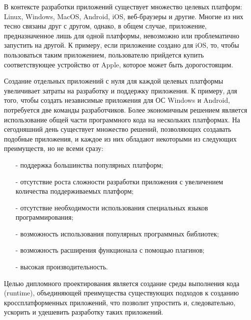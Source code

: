 В контексте разработки приложений существует множество целевых платформ: Linux, Windows, MacOS, Android, iOS, веб-браузеры и другие.
Многие из них тесно связаны друг с другом, однако, в общем случае, приложение, предназначенное лишь для одной платформы, невозможно или проблематично запустить на другой.
К примеру, если приложение создано для iOS, то, чтобы пользоваться таким приложением, пользователю прийдется купить соответствующее устройство от Apple, которое может быть дорогостоящим.

Создание отдельных приложений с нуля для каждой целевых платформы увеличивает затраты на разработку и поддержку приложения. 
К примеру, для того, чтобы создать независимые приложения для ОС Windows и Android, потребуется две команды разработчиков.
Более экономичным решением является использование общей части программного кода на нескольких платформах.
На сегодняшний день существует множество решений, позволяющих создавать подобные приложения, и каждое из них обладают некоторыми из следующих преимуществ, но не всеми сразу:
\begin{itemize}
    \item[-] поддержка большинства популярных платформ;
    \item[-] отсутствие роста сложности разработки приложения с увеличением количества поддерживаемых платформ;
    \item[-] отсутствие необходимости использования специальных языков программирования;
    \item[-] возможность использования популярных программных библиотек;
    \item[-] возможность расширения функционала с помощью плагинов;
    \item[-] высокая производительность.
\end{itemize}

Целью дипломного проектирования является создание среды выполнения кода (runtime), объединяющей преимущества существующих подходов к созданию кроссплатформенных приложений, что позволит упростить и, следовательно, ускорить и удешевить разработку таких приложений.
